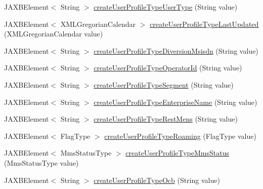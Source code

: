 \begin{DoxyCompactItemize}
\item 
JAXBElement$<$ String $>$ \hyperlink{classcom_1_1telefonica_1_1schemas_1_1unica_1_1rest_1_1directory_1_1v1_1_1ObjectFactory_a825234b30b48c2d2c96f3233705c4fff}{createUserProfileTypeUserType} (String value)
\item 
JAXBElement$<$ XMLGregorianCalendar $>$ \hyperlink{classcom_1_1telefonica_1_1schemas_1_1unica_1_1rest_1_1directory_1_1v1_1_1ObjectFactory_a9ac38302e06e97a1c0a744d6b02f7f3a}{createUserProfileTypeLastUpdated} (XMLGregorianCalendar value)
\item 
JAXBElement$<$ String $>$ \hyperlink{classcom_1_1telefonica_1_1schemas_1_1unica_1_1rest_1_1directory_1_1v1_1_1ObjectFactory_ac68474baaf2a680cf3fa19547962d39b}{createUserProfileTypeDiversionMsisdn} (String value)
\item 
JAXBElement$<$ String $>$ \hyperlink{classcom_1_1telefonica_1_1schemas_1_1unica_1_1rest_1_1directory_1_1v1_1_1ObjectFactory_a02078f32da732722db924c54e0d02ef1}{createUserProfileTypeOperatorId} (String value)
\item 
JAXBElement$<$ String $>$ \hyperlink{classcom_1_1telefonica_1_1schemas_1_1unica_1_1rest_1_1directory_1_1v1_1_1ObjectFactory_af52fde80b98514bec6586309f606b195}{createUserProfileTypeSegment} (String value)
\item 
JAXBElement$<$ String $>$ \hyperlink{classcom_1_1telefonica_1_1schemas_1_1unica_1_1rest_1_1directory_1_1v1_1_1ObjectFactory_a0fd91bce374e67a0a0eced6fe15fc76b}{createUserProfileTypeEnterpriseName} (String value)
\item 
JAXBElement$<$ String $>$ \hyperlink{classcom_1_1telefonica_1_1schemas_1_1unica_1_1rest_1_1directory_1_1v1_1_1ObjectFactory_a3a9c1521aed6c3054fc16aac856061f2}{createUserProfileTypeRestMens} (String value)
\item 
JAXBElement$<$ FlagType $>$ \hyperlink{classcom_1_1telefonica_1_1schemas_1_1unica_1_1rest_1_1directory_1_1v1_1_1ObjectFactory_a7a878941e2310b46f84766f94f7fcd4e}{createUserProfileTypeRoaming} (FlagType value)
\item 
JAXBElement$<$ MmsStatusType $>$ \hyperlink{classcom_1_1telefonica_1_1schemas_1_1unica_1_1rest_1_1directory_1_1v1_1_1ObjectFactory_aa503d7f6fbdf1c35067a26ccfa36d50b}{createUserProfileTypeMmsStatus} (MmsStatusType value)
\item 
JAXBElement$<$ String $>$ \hyperlink{classcom_1_1telefonica_1_1schemas_1_1unica_1_1rest_1_1directory_1_1v1_1_1ObjectFactory_abe676f31e529bd311c988f33874aeaa5}{createUserProfileTypeOcb} (String value)
\item 

\end{DoxyCompactItemize}

